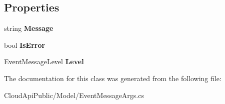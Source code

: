 \subsection*{Properties}
\begin{DoxyCompactItemize}
\item 
\hypertarget{class_cloud_api_public_1_1_model_1_1_event_message_args_a786331005cb17b9eecedda7a632c99df}{string {\bfseries Message}}\label{class_cloud_api_public_1_1_model_1_1_event_message_args_a786331005cb17b9eecedda7a632c99df}

\item 
\hypertarget{class_cloud_api_public_1_1_model_1_1_event_message_args_a9fb2d21d8d3d076b1fd8b30d23493d91}{bool {\bfseries Is\-Error}}\label{class_cloud_api_public_1_1_model_1_1_event_message_args_a9fb2d21d8d3d076b1fd8b30d23493d91}

\item 
\hypertarget{class_cloud_api_public_1_1_model_1_1_event_message_args_a15bc53bc1657c2413b3a39aa293a5031}{Event\-Message\-Level {\bfseries Level}}\label{class_cloud_api_public_1_1_model_1_1_event_message_args_a15bc53bc1657c2413b3a39aa293a5031}

\end{DoxyCompactItemize}


The documentation for this class was generated from the following file\-:\begin{DoxyCompactItemize}
\item 
Cloud\-Api\-Public/\-Model/Event\-Message\-Args.\-cs\end{DoxyCompactItemize}
